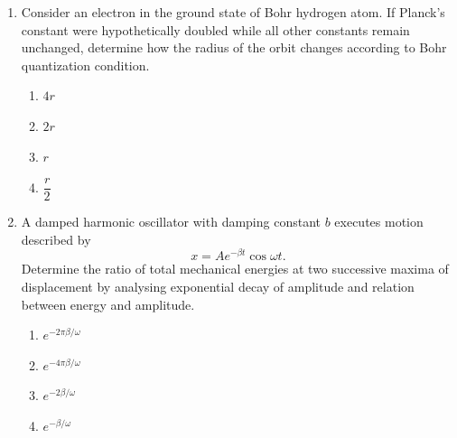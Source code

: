 \documentclass[12pt]{article}
\begin{document}
\begin{enumerate}
\begin{enumerate}[label=\Alph*)]
\item $BLv$
\item $Bv$
\item $Lv$
\item zero
\end{enumerate}


\item
Consider an electron in the ground state of Bohr hydrogen atom. If Planck’s constant were hypothetically doubled while all other constants remain unchanged, determine how the radius of the orbit changes according to Bohr quantization condition.

\begin{enumerate}[label=\Alph*)]
\item $4r$
\item $2r$
\item $r$
\item $\dfrac{r}{2}$
\end{enumerate}


\item
A damped harmonic oscillator with damping constant $b$ executes motion described by  
\[
x=Ae^{-\beta t}\cos\omega t.
\]
Determine the ratio of total mechanical energies at two successive maxima of displacement by analysing exponential decay of amplitude and relation between energy and amplitude.

\begin{enumerate}[label=\Alph*)]
\item $e^{-2\pi\beta/\omega}$
\item $e^{-4\pi\beta/\omega}$
\item $e^{-2\beta/\omega}$
\item $e^{-\beta/\omega}$
\end{enumerate}


\end{enumerate}
\end{document}

